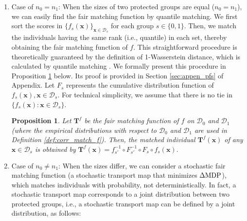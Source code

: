 \documentclass[10pt]{article} %
\newtheorem{proposition}[theorem]{Proposition}
\begin{document}
\begin{enumerate}
    \item 
    Case of $n_{0} = n_{1}$:
    When the sizes of two protected groups are equal ($n_{0} = n_{1}$), we can easily find the fair matching function by quantile matching.
    We first sort the scores in $\{ f_{s}(\mathbf{x}) \}_{\mathbf{x} \in \mathcal{D}_{s}}$ for each group $s\in \{0,1\}.$
    Then, we match the individuals having the same rank (i.e., quantile) in each set, thereby obtaining the fair matching function of $f.$
    This straightforward procedure is theoretically guaranteed by the definition of 1-Wasserstein distance, which is calculated by quantile matching \citep{rachev1998mass, NEURIPS2020_51cdbd26, pmlr-v115-jiang20a}.
    We formally present this procedure in Proposition \ref{prop:quantile_match} below.
    Its proof is provided in Section \ref{sec:appen_pfs} of Appendix.
    Let $F_{s}$ represents the cumulative distribution function of $ f_{s}(\mathbf{x}), \mathbf{x} \in {\mathcal{D}}_{s}.$ 
    For technical simplicity, we assume that there is no tie in $\{ f_{s}(\mathbf{x}): \mathbf{x} \in {\mathcal{D}}_{s}\}.$ 
    \begin{proposition}\label{prop:quantile_match}
        Let $\mathbf{T}^f$ be the {fair matching function} of $f$ on $\mathcal{D}_0$ and $\mathcal{D}_1$
        (where the empirical distributions with respect to $\mathcal{D}_0$ and $\mathcal{D}_1$ are used in Definition \ref{def:corr_match_f}).
        Then, the matched individual $ \mathbf{T}^{f} (\mathbf{x}) $ of any $\mathbf{x} \in {\mathcal{D}}_{s}$ is obtained by
        $ \mathbf{T}^{f}(\mathbf{x}) = f_{s'}^{-1} \circ F_{s'}^{-1} \circ F_{s} \circ f_{s}(\mathbf{x}). $
    \end{proposition}

    \item 
    Case of $n_{0} \neq n_{1}$:
    When the sizes differ, we can consider a stochastic fair matching function (a stochastic transport map that minimizes $\Delta \textup{MDP}$), which matches individuals with probability, not deterministically.
    In fact, a stochastic transport map corresponds to a joint distribution between two protected groups, i.e., a stochastic transport map can be defined by a joint distribution, as follows:
    

\end{enumerate}
\end{document}
